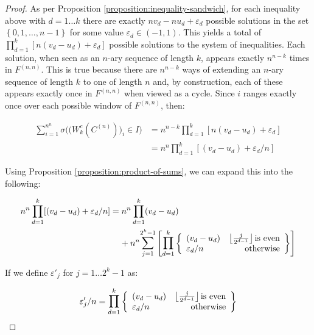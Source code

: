 \documentclass[11pt,a4paper]{tesis}
\theoremstyle{plain}
\theoremstyle{definition}
\begin{document}
\begin{proof}
  As per Proposition \ref{proposition:inequality-sandwich}, for each inequality above with $d = 1 \dots k$ there are exactly $n v_d - n u_d + \varepsilon_d$ possible solutions in the set $ \left \{ 0, 1, \dots, n - 1 \right \} $ for some value $\varepsilon_d \in (-1, 1)$. This yields a total of $\prod_{d = 1}^{k} [n (v_d - u_d) + \varepsilon_d]$ possible solutions to the system of inequalities. Each solution, when seen as an $n$-ary sequence of length $k$, appears exactly $n^{n - k}$ times in $F^{(n, n)}$. This is true because there are  $n^{n - k}$ ways of extending an $n$-ary sequence of length $k$ to one of length $n$ and, by construction, each of these appears exactly once in $F^{(n, n)}$ when viewed as a cycle. Since $i$ ranges exactly once over each possible window of $F^{(n, n)}$, then:

  \begin{equation}\label{equation:count-windows-c-n}
    \begin{aligned}
      \sum_{i = 1}^{n^n} \sigma\Big( \big( W_k^{c}(C^{(n)}) \big)_i \in I \Big) & = n^{n - k} \prod_{d = 1}^{k} [n (v_d - u_d) + \varepsilon_d] \\
      & = n^n \prod_{d = 1}^{k} [(v_d - u_d) + \varepsilon_d / n]
    \end{aligned}
  \end{equation}

  Using Proposition \ref{proposition:product-of-sums}, we can expand this into the following:

  \begin{equation}\label{equation:product-expansion}
    \begin{aligned}
      n^n \prod_{d = 1}^{k} [(v_d - u_d) + \varepsilon_d / n]
      & = n^n \prod_{d = 1}^{k} (v_d - u_d) \\
      & \hspace*{4mm} + n^n \mathlarger{\sum}_{j = 1}^{2^k - 1}
      \left [ \mathlarger{\prod}_{d = 1}^{k} \left \{ \begin{array}{lr}
      (v_d - u_d) & \left \lfloor \frac{j}{2^{d - 1}} \right \rfloor \text{is even} \\
      \varepsilon_d / n & \text{otherwise}
    \end{array} \right \} \right ]
    \end{aligned}
  \end{equation}

  If we define $\varepsilon'_j$ for $j = 1 \dots 2^k - 1$ as:

  \begin{equation*}
    \varepsilon'_j / n = \mathlarger{\prod}_{d = 1}^{k} \left \{ \begin{array}{lr}
      (v_d - u_d) & \left \lfloor \frac{j}{2^{d - 1}} \right \rfloor \text{is even} \\
      \varepsilon_d / n & \text{otherwise}
    \end{array} \right \}
  \end{equation*}


\end{proof}
\end{document}
